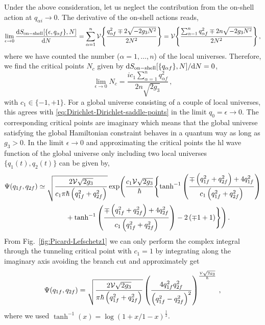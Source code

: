 \documentclass[superscriptaddress,aps,preprintnumbers,nofootinbib]{revtex4-2}
\begin{document}
Under the above consideration, let us neglect the contribution from the on-shell action at $q_{\alpha i}\to 0$. The derivative of the on-shell actions reads,
\begin{align}
\lim_{\epsilon \to 0}\frac{\mathrm{d} 
S_{\rm on-shell}[\{\epsilon,q_{\alpha f}\}, N]}{\mathrm{d} N}=
\sum_{\alpha=1}^n{\cal V}\Biggl\{\frac{q_{\alpha f}^2\mp 
2\sqrt{-2g_{3}N^2}}{2 N^2}\Biggr\}=
{\cal V}\Biggl\{\frac{\sum_{\alpha=1}^n q_{\alpha f}^2\mp 
2n\sqrt{-2g_{3}N^2}}{2 N^2}\Biggr\}\,, 
\end{align}
where we have counted the number ($\alpha=1,\dots, n$) of the local universes. Therefore, we find the critical points $N_c$ given by $\mathrm{d} S_{\rm on-shell}[\{q_{\alpha f}\}, N]/\mathrm{d} N =0$,
\begin{equation}
\lim_{\epsilon \to 0} N_c=\frac{ic_{1}\sum_{\alpha=1}^n q_{\alpha f}^2}{2n\sqrt{2g_3}}\,,
\end{equation}
with $c_{1} \in \{-1 , +1\}$. For a global universe consisting of a couple of local universes, this agrees with \eqref{eq:Dirichlet-Dirichlet-saddle-points} in the limit $q_0=\epsilon\to 0$. The corresponding critical points are imaginary which means that the global universe satisfying the global Hamiltonian constraint behaves in a quantum way as long as $g_3>0$. In the limit $\epsilon \to 0$ and approximating the critical points the \ac{hl} wave function of the global universe only including two local universes $\{q_{1}(t),q_{2}(t)\}$ can be given by, 
\begin{align}
\begin{split}
\Psi(q_{1f},q_{2f}) & \simeq \sqrt{\frac{2{\cal V}\sqrt{2g_{3}}}{c_1\pi\hbar\left(q_{1f}^2+q_{2f}^2\right)} }
\exp \Biggl(\frac{c_1{\cal V}\sqrt{2g_{3}}}{\hbar}\Biggl\{
 \tanh ^{-1}\left(\frac{\mp \left(q_{1f}^2+q_{2f}^2\right)+4 q_{1f}^2}{c_1 \left(q_{1f}^2+q_{2f}^2\right)}\right)\\ & \qquad\qquad +\tanh ^{-1}\left(\frac{\mp \left(q_{1f}^2+q_{2f}^2\right)+4 q_{2f}^2}{c_1 \left(q_{1f}^2+q_{2f}^2\right)}\right) 
-2 \left(\mp 1+1\right) \Biggr\}\Biggr)\,.
\end{split}
\end{align}
From Fig.~\ref{fig:Picard-Lefschetz1} we can only perform the complex integral through the tunneling critical point with $c_1=1$ by integrating along the imaginary axis avoiding the branch cut and approximately get 
\begin{equation}
\Psi(q_{1f},q_{2f})=\sqrt{\frac{2{\cal V}\sqrt{2g_{3}}}
{\pi\hbar\left(q_{1f}^2+q_{2f}^2\right)} }\left(\frac{4 q_{1f}^2 q_{2f}^2}{\left(q_{1f}^2-q_{2f}^2\right)^2}\right)^{\frac{{\cal V}\sqrt{2 g_3}}{\hbar }}\,,
\end{equation}
where we used $\tanh ^{-1}(x)= \log\left({1+x}/{1-x}\right)^{\frac{1}{2}}$.
\end{document}
